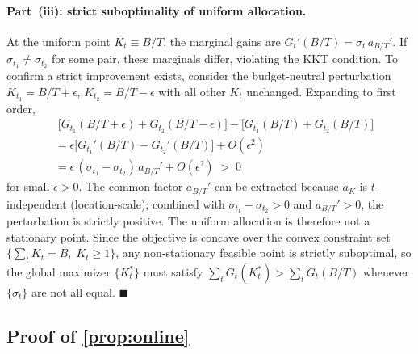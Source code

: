 \paragraph{Part~(iii): strict suboptimality of uniform allocation.}
At the uniform point $K_t\equiv B/T$, the marginal gains are
$G_t'(B/T)=\sigma_t\,a_{B/T}'$.
If $\sigma_{t_1}\neq\sigma_{t_2}$ for some pair, these marginals differ,
violating the KKT condition.
To confirm a strict improvement exists, consider the budget-neutral
perturbation $K_{t_1}=B/T+\epsilon$,
$K_{t_2}=B/T-\epsilon$ with all other $K_t$ unchanged.
Expanding to first order,
\begin{align*}
  &\;\bigl[G_{t_1}(B/T+\epsilon)+G_{t_2}(B/T-\epsilon)\bigr]
   -\bigl[G_{t_1}(B/T)+G_{t_2}(B/T)\bigr] \\
  &= \epsilon\bigl[G_{t_1}'(B/T)-G_{t_2}'(B/T)\bigr]+O(\epsilon^2) \\
  &= \epsilon\,(\sigma_{t_1}-\sigma_{t_2})\,a_{B/T}'+O(\epsilon^2)
   \;>\;0
\end{align*}
for small $\epsilon>0$.
The common factor $a_{B/T}'$ can be extracted because $a_K$ is
$t$-independent (location-scale); combined with
$\sigma_{t_1}-\sigma_{t_2}>0$ and $a_{B/T}'>0$, the perturbation
is strictly positive.
The uniform allocation is therefore not a stationary point.
Since the objective is concave over the convex constraint set
$\{\sum_t K_t=B,\;K_t\ge 1\}$, any non-stationary feasible point
is strictly suboptimal, so the global maximizer $\{K_t^*\}$
must satisfy $\sum_t G_t(K_t^*)>\sum_t G_t(B/T)$ whenever
$\{\sigma_t\}$ are not all equal.
\hfill$\blacksquare$

\subsection{Proof of \texorpdfstring{\cref{prop:online}}{Proposition (Online)}}
\label{sec:proof-online}

